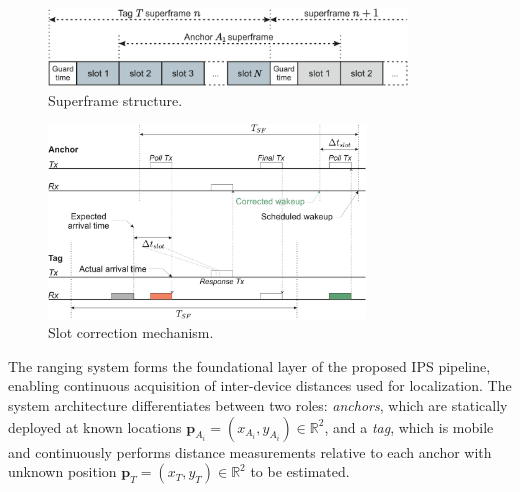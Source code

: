 \begin{figure}[tbh]
\includegraphics[width=0.85\textwidth]{Figures/methodology/superframe_structure.pdf}
\centering
\caption{Superframe structure.}
\label{fig:superframe}
\end{figure}

\begin{figure}[tbh]
\includegraphics[width=0.75\textwidth]{Figures/methodology/slot_correction.pdf}
\centering
\caption{Slot correction mechanism.}
\label{fig:slot_correction}
\end{figure}

The ranging system forms the foundational layer of the proposed IPS pipeline, enabling continuous acquisition of inter-device distances used for localization. The system architecture differentiates between two roles: \textit{anchors}, which are statically deployed at known locations $\mathbf{p}_{A_i} = (x_{A_i}, y_{A_i}) \in \mathbb{R}^2$, and a \textit{tag}, which is mobile and continuously performs distance measurements relative to each anchor with unknown position $\mathbf{p}_T = (x_T, y_T) \in \mathbb{R}^2$ to be estimated. 

